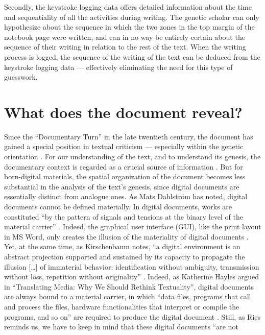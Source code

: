 \begin{paper}
Secondly, the keystroke logging data offers detailed information about
the time and sequentiality of all the activities during writing. The
genetic scholar can only hypothesize about the sequence in which the two
zones in the top margin of the notebook page were written, and can in no
way be entirely certain about the sequence of their writing in relation
to the rest of the text. When the writing process is logged, the
sequence of the writing of the text can be deduced from the keystroke
logging data --- effectively eliminating the need for this type of
guesswork.


\section{What does the document reveal?}

Since the ``Documentary Turn'' in the late twentieth century, the document
has gained a special position in textual criticism --- especially within
the genetic orientation \citep[81]{dillen_digital_2015}. For our understanding of the
text, and to understand its genesis, the documentary context is regarded
as a crucial source of information \citep{pierazzo_putting_2011,dillen_digital_2015}. But for born-digital materials, the spatial organization of the
document becomes less substantial in the analysis of the text's genesis,
since digital documents are essentially distinct from analogue ones. As
Mats Dahlström has noted, digital documents cannot be defined
materially. In digital documents, works are constituted ``by the pattern
of signals and tensions at the binary level of the material carrier''  
\citep[n.p.]{dahlstrom_drowning_2000}. Indeed, the graphical user interface
(GUI), like the print layout in MS Word, only creates the illusion of
the materiality of digital documents \citep[468]{van_hulle_logica_2019}. Yet, at the
same time, as Kirschenbaum notes, ``a digital environment is an abstract
projection supported and sustained by its capacity to propagate the
illusion [\ldots{}] of immaterial behavior: identification without
ambiguity, transmission without loss, repetition without originality'' \citep[11]{kirschenbaum_mechanisms_2008}. Indeed, as Katherine Hayles argued in ``Translating Media: Why We Should Rethink Textuality'', digital documents are always bound to a
material carrier, in which ``data files, programs that call and process
the files, hardware functionalities that interpret or compile the
programs, and so on'' are required to produce the digital document \citep[274]{hayles_translating_2003}. Still, as Ries reminds us, we have to keep in mind that these digital documents ``are not

\end{paper}

